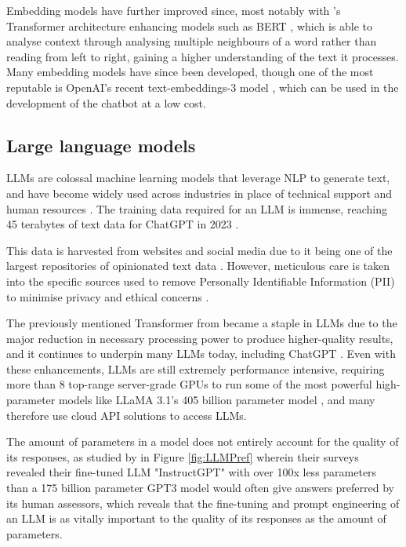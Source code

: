 \documentclass[12pt]{report}
\begin{document}
    Embedding models have further improved since, most notably with \textcite{vaswani_attention_2017}'s Transformer architecture enhancing models such as 
    BERT \autocite{devlin_bert_2019}, which is able to analyse context through analysing multiple neighbours of a word rather than reading from left to right,
    gaining a higher understanding of the text it processes. Many embedding models have since been developed, though one of the most reputable is OpenAI's 
    recent text-embeddings-3 model \autocite{openai_vector_nodate}, which can be used in the development of the chatbot at a low cost. 
    

    \pagebreak 

    \subsection{Large language models}

    LLMs are colossal machine learning models that leverage NLP to generate text, and have become widely used across 
    industries in place of technical support and human resources \autocite{vrontis_artificial_2022}. The training data required for an LLM is immense, 
    reaching 45 terabytes of text data for ChatGPT in 2023 \autocite{dwivedi_so_2023}. 
    
    This data is harvested from websites \autocite{dubey_llama_2024}
    and social media due to it being one of the largest repositories of opinionated text data \autocite{wang_fine-grained_2016}. 
    However, meticulous care is taken into the specific sources used to remove 
    Personally Identifiable Information (PII) to minimise privacy and ethical concerns \autocite{dubey_llama_2024}.
    
    The previously mentioned Transformer from \textcite{vaswani_attention_2017} 
    became a staple in LLMs due to the major reduction in necessary processing power to produce higher-quality 
    results, and it continues to underpin many LLMs today, including ChatGPT \autocite{brown_language_2020}. 
    Even with these enhancements, LLMs are still extremely performance intensive,
    requiring more than 8 top-range server-grade GPUs to run some of the most powerful high-parameter models like LLaMA 3.1's 405 billion parameter model \autocite{dubey_llama_2024},
    and many therefore use cloud API solutions to access LLMs.
    
    The amount of parameters in a model does not entirely account for the quality of its responses, as studied by \textcite{ouyang_training_2022}
    in Figure \ref{fig:LLMPref} wherein their surveys revealed their fine-tuned LLM "InstructGPT" with over 100x less parameters than a 175 billion parameter 
    GPT3 model would often give answers preferred by its human assessors, which reveals that the fine-tuning and prompt engineering of an LLM is as vitally important
    to the quality of its responses as the amount of parameters.  
    
\end{document}
